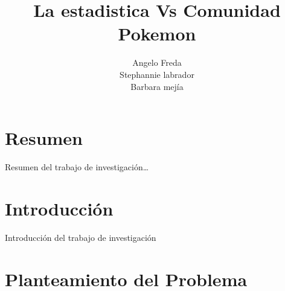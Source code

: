 \documentclass[oneside,11pt]{Latex/Classes/PhDthesisPSnPDF}
\title{La estadistica Vs Comunidad Pokemon}
\author{Angelo Freda \\ Stephannie labrador \\ Barbara mejía}
\begin{document}
\maketitle

\frontmatter


\setcounter{secnumdepth}{3}
\setcounter{tocdepth}{3}

\tableofcontents



\cleardoublepage

  \cleardoublepage       %
  \chapter*{Resumen}     %
  
  Resumen del trabajo de
investigación\ldots{}             %
  
  \cleardoublepage

\mainmatter
\def\baselinestretch{1.5}

\chapter*{Introducción}

Introducción del trabajo de investigación

\chapter{Planteamiento del Problema}
\end{document}
